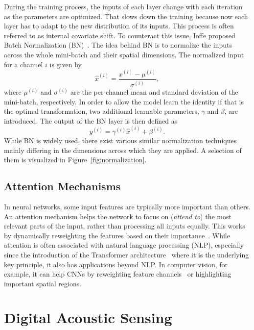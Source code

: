 During the training process, the inputs of each layer change with each iteration as the parameters are optimized.
That slows down the training because now each layer has to adapt to the new distribution of its inputs. This process is
often referred to as internal covariate shift.
To counteract this issue, Ioffe \etal proposed Batch Normalization (BN)~\cite{BatchNorm}.
The idea behind BN is to normalize the inputs across the whole mini-batch and their spatial dimensions.
The normalized input for a channel $i$ is given by
\begin{equation}
    \hat{x}^{(i)} = \frac{x^{(i)} - \mu^{(i)}}{\sigma^{(i)}},
\end{equation} 
where $\mu^{(i)}$ and $\sigma^{(i)}$ are the per-channel mean and standard deviation of the mini-batch, respectively.  
In order to allow the model learn the identity if that is the optimal transformation, two additional learnable
parameters, $\gamma$ and $\beta$, are introduced. The output of the BN layer is then defined as
\begin{equation}
    y^{(i)} = \gamma^{(i)}\hat{x}^{(i)} + \beta^{(i)}.
\end{equation}
While BN is widely used, there exist various similar normalization techniques~\cite{LayerNorm, InstanceNorm, GroupNorm}
mainly differing in the dimensions across which they are applied.
A selection of them is visualized in Figure~\ref{fig:normalization}.


\subsection{Attention Mechanisms}

In neural networks, some input features are typically more important than others.
An attention mechanism helps the network to focus on (\textit{attend to}) the most relevant parts of the
input, rather than processing all inputs equally.
This works by dynamically reweighting the features based on their importance~\cite{Attention}.
While attention is often associated with natural language processing (NLP), especially since the introduction of the
Transformer architecture~\cite{Transformer} where it is the underlying key principle, it also has applications beyond
NLP.\@
In computer vision, for example, it can help CNNs by reweighting feature channels~\cite{SqueezeExcite} or
highlighting important spatial regions.

\section{Digital Acoustic Sensing}
